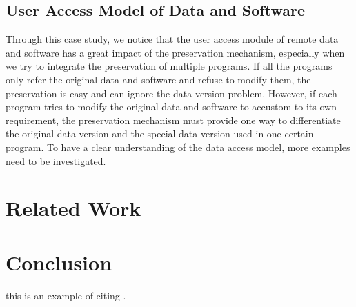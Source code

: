 \documentclass{acm_proc_article-sp}
\begin{document}
\subsection{User Access Model of Data and Software}
Through this case study, we notice that the user access module of remote data and software has a great impact of the preservation mechanism, especially when we try to integrate the preservation of multiple programs. If all the programs only refer the original data and software and refuse to modify them, the preservation is easy and can ignore the data version problem. However, if each program tries to modify the original data and software to accustom to its own requirement, the preservation mechanism must provide one way to differentiate the original data version and the special data version used in one certain program. To have a clear understanding of the data access model, more examples need to be investigated.

\section{Related Work }

\section{Conclusion}

this is an example of citing \cite{Laboratories79make}. 



\end{document}
